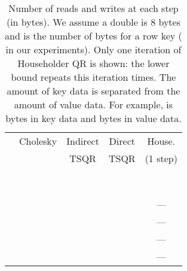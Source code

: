 \documentclass[10pt, conference, compsocconf]{IEEEtran}
\begin{document}
\begin{table*}[tbp]
\setlength{\extrarowheight}{1.5pt}
\centering
\caption{Number of reads and writes at each step (in bytes).  We assume a double is 8 bytes and  is the number of bytes for a row key ( in our experiments).  Only one iteration of Householder QR is shown: the lower bound repeats this iteration  times.  The amount of key data is separated from the amount of value data.  For example,  is  bytes in key data and  bytes in value data.}
\begin{tabular}{c @{\qquad} c c c c}
\toprule
 & Cholesky & Indirect & Direct & House. \\
 &                   & TSQR    & TSQR & (1 step) \\            
 \midrule
 &  &  &  &  \\
 &  &  &  &  \\

 &  &  &  & \\
 &  &  &  & \\

 &  &  &   &  \\
 &  &  &  & \\

 &  &  &  &  \\
 &  &  &  &  \\

 &  &  &  & ---\\
 &  &  &  & ---\\

 &  &   &  & --- \\ 
 &  &  &  & ---\\
\bottomrule
\end{tabular}
\label{tab:reads_writes}
\end{table*}
\end{document}
